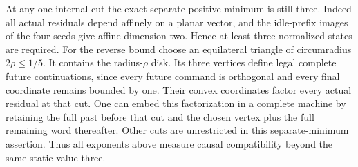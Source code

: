 At any one internal cut the exact separate positive minimum is still three. Indeed all actual residuals depend affinely on a planar vector, and the idle-prefix images of the four seeds give affine dimension two. Hence at least three normalized states are required. For the reverse bound choose an equilateral triangle of circumradius $2\rho\le1/5$. It contains the radius-$\rho$ disk. Its three vertices define legal complete future continuations, since every future command is orthogonal and every final coordinate remains bounded by one. Their convex coordinates factor every actual residual at that cut. One can embed this factorization in a complete machine by retaining the full past before that cut and the chosen vertex plus the full remaining word thereafter. Other cuts are unrestricted in this separate-minimum assertion. Thus all exponents above measure causal compatibility beyond the same static value three.
